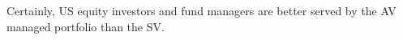 Certainly, US equity investors and fund managers are better served by the AV managed portfolio than the SV. 